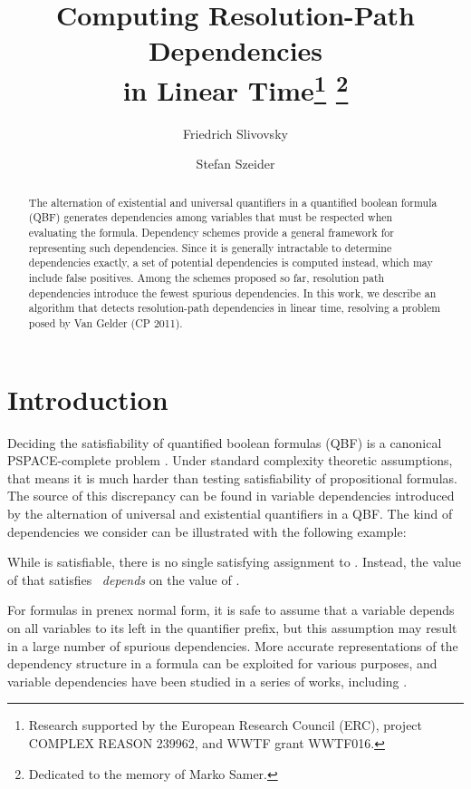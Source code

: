 \documentclass{llncs}
\def\hy{\hbox{-}\nobreak\hskip0pt} \newcommand{\ellipsis}{}
\begin{document}
\title{Computing Resolution\hy Path Dependencies\\ in Linear Time\thanks{Research supported by the European Research Council (ERC),
    project COMPLEX REASON 239962, and WWTF grant WWTF016.} \thanks{Dedicated to the memory of Marko Samer.}}

\author{Friedrich Slivovsky \and Stefan Szeider}


\maketitle

\begin{abstract}The alternation of existential and universal quantifiers in
  a quantified boolean formula (QBF) generates dependencies among variables
  that must be respected when evaluating the formula. Dependency schemes
  provide a general framework for representing such dependencies. Since it is
  generally intractable to determine dependencies exactly, a set of potential
  dependencies is computed instead, which may include false positives. Among
  the schemes proposed so far, resolution path dependencies introduce the
  fewest spurious dependencies. In this work, we describe an algorithm that
  detects resolution-path dependencies in linear time, resolving a problem
  posed by Van Gelder (CP 2011).
\end{abstract}

\section{Introduction}
Deciding the satisfiability of quantified boolean formulas (QBF) is a
canonical PSPACE-complete problem \cite{StockmeyerMeyer73}. Under standard
complexity theoretic assumptions, that means it is much harder than testing
satisfiability of propositional formulas. The source of this discrepancy can
be found in variable dependencies introduced by the alternation of universal
and existential quantifiers in a QBF. The kind of dependencies we consider can
be illustrated with the following example:
 
While  is satisfiable, there is no single satisfying assignment to
. Instead, the value of  that satisfies~ \textit{depends} on the
value of .

For formulas in prenex normal form, it is safe to assume that a variable
depends on all variables to its left in the quantifier prefix, but this
assumption may result in a large number of spurious dependencies. More
accurate representations of the dependency structure in a formula can be
exploited for various purposes, and variable dependencies have been studied in
a series of works, including
\cite{AyariBasin02,Biere04,BubeckKleinebuning07,EglyTompitsWoltran02,LonsingBiere2009,LonsingBiere2010,Samer08,SamerSzeider09a,VanGelder11}.
\end{document}

